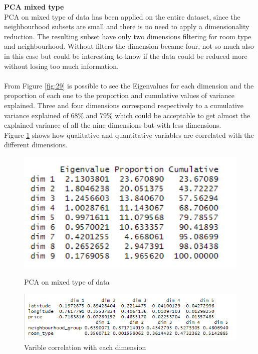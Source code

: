 \documentclass{FR16}
\begin{document}
\textbf{PCA mixed type}\\
PCA on mixed type of data has been applied on the entire dataset, since the neighbourhood subsets are small and there is no need to apply a dimensionality reduction. The resulting subset have only two dimensions filtering for room type and neighbourhood. Without filters the dimension became four, not so much also in this case but could be interesting to know if the data could be reduced more without losing too much information. 
\\\\
From Figure \ref{fig:29} is possible to see the Eigenvalues for each dimension and the proportion of each one to the proportion and cumulative values of variance explained. Three and four dimensions correspond respectively to a cumulative variance explained of $68\%$ and $79\%$ which could be acceptable to get almost the explained variance of all the nine dimensions but with less dimensions. 
\\
Figure \ref{fig:30} shows how qualitative and quantitative variables are correlated with the different dimensions.
\begin{figure}[!htb]
   \begin{minipage}{0.48\textwidth}
     \centering
    \includegraphics[width=1\textwidth]{figures/pcamix.PNG} 
 \caption{\label{fig:29} PCA on mixed type of data}
   \end{minipage}\hfill
   \begin{minipage}{0.48\textwidth}
     \centering
       \includegraphics[width=1\textwidth]{figures/pcamix2.PNG} 
 \caption{\label{fig:30} Varible correlation with each dimension }
   \end{minipage}
   
\end{figure}
\end{document}
